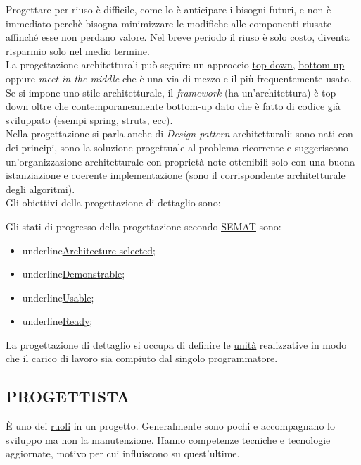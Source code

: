		Progettare per riuso è difficile, come lo è anticipare i bisogni futuri, e non è immediato perchè bisogna minimizzare le modifiche alle componenti riusate affinché esse non perdano valore. Nel breve periodo il riuso è solo costo, diventa risparmio solo nel medio termine.\\
		La progettazione architetturali può seguire un approccio \underline{\hyperref[topdown]{top-down}}, \underline{\hyperref[bottomup]{bottom-up}} oppure \textit{meet-in-the-middle} che è una via di mezzo e il più frequentemente usato. Se si impone uno stile architetturale, il \textit{framework} (ha un'architettura) è top-down oltre che contemporaneamente bottom-up dato che è fatto di codice già sviluppato (esempi spring, struts, ecc).\\
		Nella progettazione si parla anche di \textit{Design pattern} architetturali: sono nati con dei principi, sono la soluzione progettuale al problema ricorrente e suggeriscono un'organizzazione architetturale con proprietà note ottenibili solo con una buona istanziazione e coerente implementazione (sono il corrispondente architetturale degli algoritmi). \\
		Gli obiettivi della progettazione di dettaglio sono:
		
		Gli stati di progresso della progettazione secondo \underline{\hyperref[semat]{SEMAT}} sono:
			\begin{itemize}
				\item underline{\hyperref[architectureselected]{Architecture selected}};
				\item underline{\hyperref[demonstrable]{Demonstrable}};	
				\item underline{\hyperref[usable]{Usable}};
				\item underline{\hyperref[ready]{Ready}};									
			\end{itemize}
		
		La progettazione di dettaglio si occupa di definire le \underline{\hyperref[unita]{unità}} realizzative in modo che il carico di lavoro sia compiuto dal singolo programmatore.
		
		
		\subsection{PROGETTISTA}  \label{progettista}
		È uno dei \underline{\hyperref[ruoli]{ruoli}} in un progetto. Generalmente sono pochi e accompagnano lo sviluppo ma non la \underline{\hyperref[manutenzione]{manutenzione}}. Hanno competenze tecniche e tecnologie aggiornate, motivo per cui influiscono su quest'ultime. 
		

